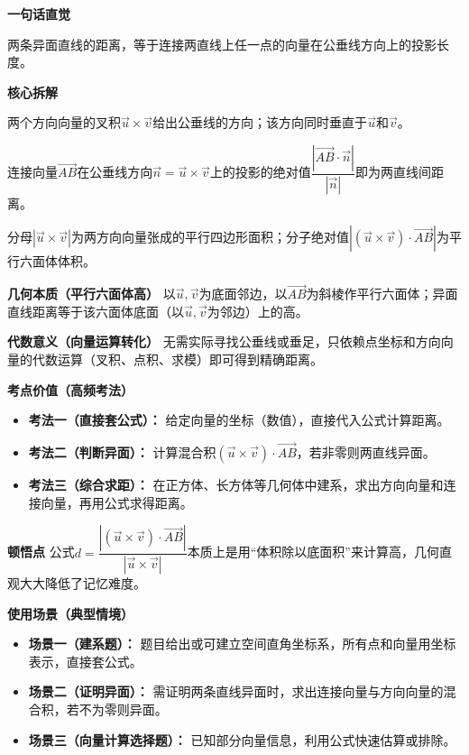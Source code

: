 \begin{explanationbox}
	\textbf{\textcolor{CExplanation}{一句话直觉}}

	两条异面直线的距离，等于连接两直线上任一点的向量在公垂线方向上的投影长度。

	\medskip
	\textbf{\textcolor{CExplanation}{核心拆解}}
	\begin{description}[style=nextline, leftmargin=2.8em, labelsep=0.5em, itemsep=0.45em]
		\item[\textbf{要点一（方向叉积）：}] 两个方向向量的叉积$\vec{u}\times\vec{v}$给出公垂线的方向；该方向同时垂直于$\vec{u}$和$\vec{v}$。
		\item[\textbf{要点二（投影转化）：}] 连接向量$\overrightarrow{AB}$在公垂线方向$\vec{n}=\vec{u}\times\vec{v}$上的投影的绝对值$\dfrac{|\overrightarrow{AB}\cdot\vec{n}|}{|\vec{n}|}$即为两直线间距离。
		\item[\textbf{要点三（面积与体积）：}] 分母$|\vec{u}\times\vec{v}|$为两方向向量张成的平行四边形面积；分子绝对值$|(\vec{u}\times\vec{v})\cdot\overrightarrow{AB}|$为平行六面体体积。
	\end{description}

	\medskip
	\textbf{\textcolor{CExplanation}{几何本质（平行六面体高）}}
	以$\vec{u},\vec{v}$为底面邻边，以$\overrightarrow{AB}$为斜棱作平行六面体；异面直线距离等于该六面体底面（以$\vec{u},\vec{v}$为邻边）上的高。

	\medskip
	\textbf{\textcolor{CExplanation}{代数意义（向量运算转化）}}
	无需实际寻找公垂线或垂足，只依赖点坐标和方向向量的代数运算（叉积、点积、求模）即可得到精确距离。

	\medskip
	\textbf{\textcolor{CExplanation}{考点价值（高频考法）}}
	\begin{itemize}[leftmargin=*, itemsep=0.5em, topsep=0.4em]
		\item \textbf{考法一（直接套公式）：} 给定向量的坐标（数值），直接代入公式计算距离。
		\item \textbf{考法二（判断异面）：} 计算混合积$(\vec{u}\times\vec{v})\cdot\overrightarrow{AB}$，若非零则两直线异面。
		\item \textbf{考法三（综合求距）：} 在正方体、长方体等几何体中建系，求出方向向量和连接向量，再用公式求得距离。
	\end{itemize}

	\medskip
	\textbf{\textcolor{CExplanation}{顿悟点}}
	公式$d=\dfrac{|(\vec{u}\times\vec{v})\cdot\overrightarrow{AB}|}{|\vec{u}\times\vec{v}|}$本质上是用“体积除以底面积”来计算高，几何直观大大降低了记忆难度。

	\medskip
	\textbf{\textcolor{CExplanation}{使用场景（典型情境）}}
	\begin{itemize}[leftmargin=*, itemsep=0.5em, topsep=0.4em]
		\item \textbf{场景一（建系题）：} 题目给出或可建立空间直角坐标系，所有点和向量用坐标表示，直接套公式。
		\item \textbf{场景二（证明异面）：} 需证明两条直线异面时，求出连接向量与方向向量的混合积，若不为零则异面。
		\item \textbf{场景三（向量计算选择题）：} 已知部分向量信息，利用公式快速估算或排除。
	\end{itemize}
\end{explanationbox}

